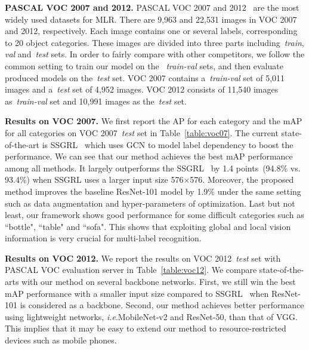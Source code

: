 \documentclass[journal]{IEEEtran}
\makeatletter
\DeclareRobustCommand\onedot{\@onedot}
\def\@onedot{.}
\def\ie{\emph{i.e}\onedot}
\makeatother
\begin{document}
\noindent \textbf{PASCAL VOC 2007 and 2012.}
PASCAL VOC 2007 and 2012~\cite{everingham2010pascal} are the most widely used datasets for MLR. There are 9,963 and 22,531 images in  VOC 2007 and 2012, respectively. Each image contains one or several labels, corresponding to 20 object categories. These images are divided into three parts including~\emph{train}, \emph{val} and~\emph{test} sets. In order to fairly compare with other competitors, we follow the common setting to train our model on the~
\emph{train-val} sets, and then evaluate produced models on the~\emph{test} set. VOC 2007 contains a~\emph{train-val} set of 5,011 images and a~\emph{test} set of 4,952 images. VOC 2012 consists of 11,540 images as~\emph{train-val} set and 10,991 images as the~\emph{test} set.

\noindent \textbf{Results on VOC 2007.}
We first report the AP for each category and the mAP for all categories on VOC 2007~\emph{test} set in Table~\ref{table:voc07}. The current state-of-the-art is SSGRL~\cite{chenlearning} which uses GCN to model label dependency to boost the performance. We can see that our method achieves the best mAP performance among all methods. 
It largely outperforms the SSGRL~\cite{chen2019multi} by 1.4 points~(94.8\% vs. 93.4\%) when SSGRL uses a larger input size 576$\times$576. 
Moreover, the proposed method improves the baseline ResNet-101 model by 1.9\% under the same setting such as data augmentation and hyper-parameters of optimization. Last but not least, our framework shows good performance for some difficult categories such as ``bottle", ``table" and ``sofa". This shows that exploiting global and local vision information is very crucial for multi-label recognition.

\noindent \textbf{Results on VOC 2012.}
We report the results on VOC 2012~\emph{test} set with PASCAL VOC evaluation server in Table~\ref{table:voc12}. We compare state-of-the-arts with our method on several backbone networks. First, we still win the best mAP performance with a smaller input size compared to SSGRL~\cite{chenlearning} when ResNet-101 is considered as a backbone. Second, our method achieves better performance using lightweight networks, \ie MobileNet-v2 and ResNet-50, than that of VGG. This implies that it may be easy to extend our method to resource-restricted devices such as mobile phones.
\end{document}
